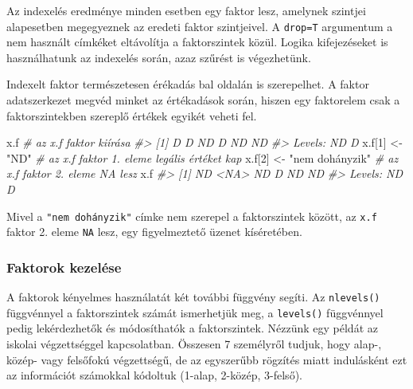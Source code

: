 \documentclass[
]{book}
\newenvironment{Shaded}{\begin{snugshade}}{\end{snugshade}}
\newcommand{\CommentTok}[1]{\textcolor[rgb]{0.56,0.35,0.01}{\textit{#1}}}
\newcommand{\DecValTok}[1]{\textcolor[rgb]{0.00,0.00,0.81}{#1}}
\newcommand{\NormalTok}[1]{#1}
\newcommand{\OtherTok}[1]{\textcolor[rgb]{0.56,0.35,0.01}{#1}}
\newcommand{\StringTok}[1]{\textcolor[rgb]{0.31,0.60,0.02}{#1}}
\begin{document}
Az indexelés eredménye minden esetben egy faktor lesz, amelynek szintjei alapesetben megegyeznek az eredeti faktor szintjeivel. A \texttt{drop=T} argumentum a nem használt címkéket eltávolítja a faktorszintek közül. Logika kifejezéseket is használhatunk az indexelés során, azaz szűrést is végezhetünk.

Indexelt faktor természetesen érékadás bal oldalán is szerepelhet. A faktor adatszerkezet megvéd minket az értékadások során, hiszen egy faktorelem csak a faktorszintekben szereplő értékek egyikét veheti fel.

\begin{Shaded}
\begin{Highlighting}[]
\NormalTok{x.f                        }\CommentTok{\# az x.f faktor kiírása}
\CommentTok{\#\textgreater{} [1] D  D  ND D  ND ND}
\CommentTok{\#\textgreater{} Levels: ND D}
\NormalTok{x.f[}\DecValTok{1}\NormalTok{] }\OtherTok{\textless{}{-}} \StringTok{"ND"}             \CommentTok{\# az x.f faktor 1. eleme legális értéket kap}
\NormalTok{x.f[}\DecValTok{2}\NormalTok{] }\OtherTok{\textless{}{-}} \StringTok{"nem dohányzik"}  \CommentTok{\# az x.f faktor 2. eleme NA lesz}
\NormalTok{x.f}
\CommentTok{\#\textgreater{} [1] ND   \textless{}NA\textgreater{} ND   D    ND   ND  }
\CommentTok{\#\textgreater{} Levels: ND D}
\end{Highlighting}
\end{Shaded}

Mivel a \texttt{"nem\ dohányzik"} címke nem szerepel a faktorszintek között, az \texttt{x.f} faktor 2. eleme \texttt{NA} lesz, egy figyelmeztető üzenet kíséretében.

\hypertarget{faktorok-kezeluxe9se}{%
\subsubsection{Faktorok kezelése}\label{faktorok-kezeluxe9se}}

A faktorok kényelmes használatát két további függvény segíti. Az \texttt{nlevels()} függvénnyel a faktorszintek számát ismerhetjük meg, a \texttt{levels()} függvénnyel pedig lekérdezhetők és módosíthatók a faktorszintek. Nézzünk egy példát az iskolai végzettséggel kapcsolatban. Összesen 7 személyről tudjuk, hogy alap-, közép- vagy felsőfokú végzettségű, de az egyszerűbb rögzítés miatt indulásként ezt az információt számokkal kódoltuk (1-alap, 2-közép, 3-felső).
\end{document}
